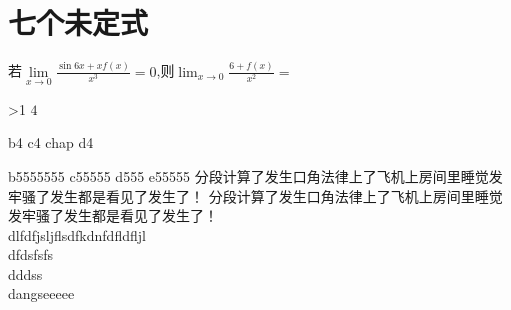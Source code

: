\section{七个未定式}
\begin{multicols}{2}
\begin{examples}
	若$\lim\limits_{x\to0}{\frac{\sin{6x}+xf(x)}{x^3}}=0$,则$\lim_{x\to0}{\frac{6+f(x)}{x^2}}=$

\end{examples}


\ifnum \value{page}>1
	$4$
\fi

			{b4}
			{c4}
			{chap}
			{d4}

			{b5555555}
			{c55555}
			{d555}
			{e55555}
			分段计算了发生口角法律上了飞机上房间里睡觉发牢骚了发生都是看见了发生了！
			分段计算了发生口角法律上了飞机上房间里睡觉发牢骚了发生都是看见了发生了！\\
	dlfdfjsljflsdfkdnfdfldfljl \\
	dfdsfsfs \\
	dddss\\
	dangseeeee
\end{multicols}

